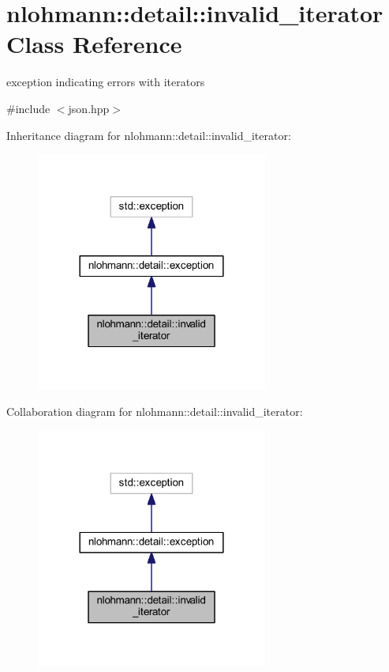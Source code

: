 \hypertarget{classnlohmann_1_1detail_1_1invalid__iterator}{}\section{nlohmann\+::detail\+::invalid\+\_\+iterator Class Reference}
\label{classnlohmann_1_1detail_1_1invalid__iterator}


exception indicating errors with iterators  




{\ttfamily \#include $<$json.\+hpp$>$}



Inheritance diagram for nlohmann\+::detail\+::invalid\+\_\+iterator\+:
\nopagebreak
\begin{figure}[H]
\begin{center}
\leavevmode
\includegraphics[width=216pt]{classnlohmann_1_1detail_1_1invalid__iterator__inherit__graph}
\end{center}
\end{figure}


Collaboration diagram for nlohmann\+::detail\+::invalid\+\_\+iterator\+:
\nopagebreak
\begin{figure}[H]
\begin{center}
\leavevmode
\includegraphics[width=216pt]{classnlohmann_1_1detail_1_1invalid__iterator__coll__graph}
\end{center}
\end{figure}

